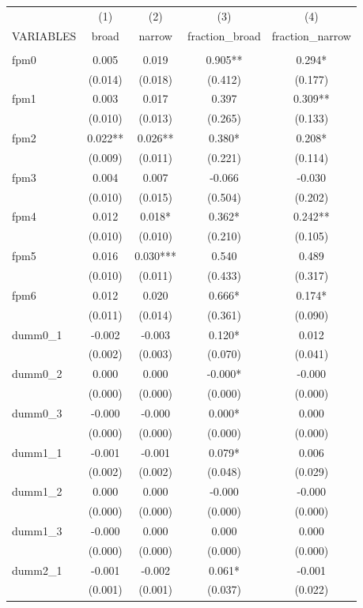 \documentclass[]{article}
\begin{document}
\begin{tabular}{lcccc} \hline
 & (1) & (2) & (3) & (4) \\
VARIABLES & broad & narrow & fraction\_broad & fraction\_narrow \\ \hline
 &  &  &  &  \\
fpm0 & 0.005 & 0.019 & 0.905** & 0.294* \\
 & (0.014) & (0.018) & (0.412) & (0.177) \\
fpm1 & 0.003 & 0.017 & 0.397 & 0.309** \\
 & (0.010) & (0.013) & (0.265) & (0.133) \\
fpm2 & 0.022** & 0.026** & 0.380* & 0.208* \\
 & (0.009) & (0.011) & (0.221) & (0.114) \\
fpm3 & 0.004 & 0.007 & -0.066 & -0.030 \\
 & (0.010) & (0.015) & (0.504) & (0.202) \\
fpm4 & 0.012 & 0.018* & 0.362* & 0.242** \\
 & (0.010) & (0.010) & (0.210) & (0.105) \\
fpm5 & 0.016 & 0.030*** & 0.540 & 0.489 \\
 & (0.010) & (0.011) & (0.433) & (0.317) \\
fpm6 & 0.012 & 0.020 & 0.666* & 0.174* \\
 & (0.011) & (0.014) & (0.361) & (0.090) \\
dumm0\_1 & -0.002 & -0.003 & 0.120* & 0.012 \\
 & (0.002) & (0.003) & (0.070) & (0.041) \\
dumm0\_2 & 0.000 & 0.000 & -0.000* & -0.000 \\
 & (0.000) & (0.000) & (0.000) & (0.000) \\
dumm0\_3 & -0.000 & -0.000 & 0.000* & 0.000 \\
 & (0.000) & (0.000) & (0.000) & (0.000) \\
dumm1\_1 & -0.001 & -0.001 & 0.079* & 0.006 \\
 & (0.002) & (0.002) & (0.048) & (0.029) \\
dumm1\_2 & 0.000 & 0.000 & -0.000 & -0.000 \\
 & (0.000) & (0.000) & (0.000) & (0.000) \\
dumm1\_3 & -0.000 & 0.000 & 0.000 & 0.000 \\
 & (0.000) & (0.000) & (0.000) & (0.000) \\
dumm2\_1 & -0.001 & -0.002 & 0.061* & -0.001 \\
 & (0.001) & (0.001) & (0.037) & (0.022) \\

\end{tabular}
\end{document}
